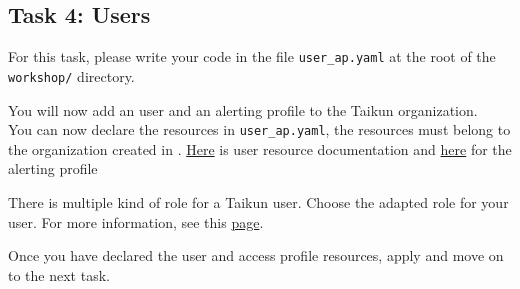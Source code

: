 \subsection{Task 4: Users}\label{sec:user_ap}

\begin{note}
For this task, please write your code in the file \texttt{user\_ap.yaml}
at the root of the \texttt{workshop/} directory.
\end{note}

You will now add an user and an alerting profile to the Taikun
 organization.\\

You can now declare the resources in \texttt{user\_ap.yaml}, the resources must 
belong to the organization created in .
\href{https://github.com/itera-io/provider-jet-taikun/blob/main/docs/user.taikun.jet.crossplane.io.md}{Here} 
is user resource documentation and \href{https://github.com/itera-io/provider-jet-taikun/blob/main/docs/alertingprofile.taikun.jet.crossplane.io.md}{here} 
for the alerting profile

\begin{note}
There is multiple kind of role for a Taikun user. Choose the adapted role for 
your user.
For more information, see this \href{https://taikun.cloud/docs/user/}{page}.
\end{note}



Once you have declared the user and access profile resources, apply and move
 on to the next task.
